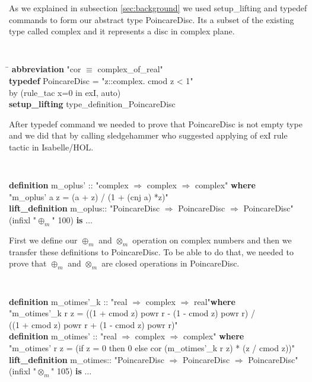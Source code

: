 \documentclass[a4paper]{article}
\newcommand{\tab}{\hspace{5mm}}
\theoremstyle{definition}
\begin{document}
As we explained in subsection \ref{sec:background} we used setup\_lifting and typedef commands to form our abstract type PoincareDisc. Its a subset of the existing type called complex and it represents a disc in complex plane.

\begin{small}
{\tt
\begin{tabbing}
\hspace{5mm}\=\kill
{\bf abbreviation} "cor $\equiv$ complex\_of\_real"\\
{\bf typedef} PoincareDisc = "{z::complex. cmod z < 1}"\\
 \hspace{0.5cm} by (rule\_tac x=0 in exI, auto)\\
{\bf setup\_lifting} type\_definition\_PoincareDisc \\
\end{tabbing}
}
\end{small}
After typedef command we needed to prove that PoincareDisc is not empty type and we did that by calling sledgehammer who suggested applying of exI rule tactic in Isabelle/HOL.


{\tt
\begin{footnotesize}
\begin{tabbing}
{\bf definition} m\_oplus' :: "complex $\Rightarrow$ complex $\Rightarrow$ complex" {\bf where}\\
\tab "m\_oplus' a z = (a + z) / (1 + (cnj a) *z)"\\

{\bf lift\_definition} m\_oplus:: "PoincareDisc $\Rightarrow$ PoincareDisc $\Rightarrow$ PoincareDisc" \\
\tab (infixl "$\oplus_m$" 100) {\bf is} $\ldots$
\end{tabbing}
\end{footnotesize}
}

First we define our $\oplus_m$ and $\otimes_m$ operation on complex numbers and then we transfer these definitions to PoincareDisc. To be able to do that, we needed to prove that $\oplus_m$ and $\otimes_m$ are closed operations in PoincareDisc.


{\tt
\begin{footnotesize}
\begin{tabbing}
{\bf definition}  m\_otimes'\_k  :: "real $\Rightarrow$ complex $\Rightarrow$ real"{\bf where}\\
\tab "m\_otimes'\_k r z = ((1 + cmod z) powr r - (1 - cmod z) powr r) /\\
\tab
                     ((1 + cmod z) powr r + (1 - cmod z) powr r)"\\ 
{\bf definition} m\_otimes' :: "real $\Rightarrow$ complex $\Rightarrow$ complex" {\bf where}\\"m\_otimes' r z = 
 (if z = 0 then 0 else cor (m\_otimes'\_k r z) * (z / cmod z))"\\
{\bf lift\_definition} m\_otimes:: "PoincareDisc $\Rightarrow$ PoincareDisc $\Rightarrow$ PoincareDisc" \\
\tab (infixl "$\otimes_m$" 105) {\bf is} $\ldots$
\end{tabbing}
\end{footnotesize}
}
\end{document}
